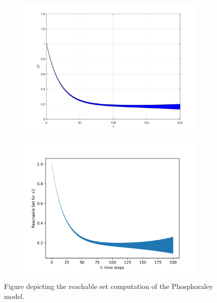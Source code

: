 \documentclass[EPiC]{easychair}
\begin{document}
\begin{figure}[h]
    \begin{subfigure}{0.5\textwidth}
    \centering
    \includegraphics[width=\textwidth]{SapoFigures/Phos/SapoPhos_X3.jpg}
    \end{subfigure}
    \begin{subfigure}{0.6\textwidth}
    \centering
    \includegraphics[width=\textwidth]{SapoFigures/Phos/KaaPhos_X3.png}
    \end{subfigure}
    
    \caption{Figure depicting the reachable set computation of the Phosphoraley model.} 
    \label{fig5}
\end{figure}
\end{document}
